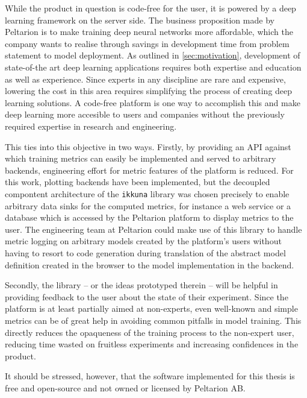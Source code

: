 While the product in question is code-free for the user, it is powered by a deep
learning framework on the server side. The business proposition made by
Peltarion is to make training deep neural networks more affordable, which the
company wants to realise through savings in development time from problem
statement to model deployment. As outlined in \cref{sec:motivation}, development
of state-of-the art deep learning applications requires both expertise and
education as well as experience. Since experts in any discipline are rare and
expensive, lowering the cost in this area requires simplifying the process of
creating deep learning solutions. A code-free platform is one way to accomplish
this and make deep learning more accesible to users and companies without the
previously required expertise in research and engineering.

This ties into this objective in two ways. Firstly, by providing an API against
which training metrics can easily be implemented and served to arbitrary
backends, engineering effort for metric features of the platform is reduced. For
this work, plotting backends have been implemented, but the decoupled compontent
architecture of the \texttt{ikkuna} library was chosen precisely to enable
arbitrary data sinks for the computed metrics, for instance a web service or a
database which is accessed by the Peltarion platform to display metrics to the
user. The engineering team at Peltarion could make use of this library to handle
metric logging on arbitrary models created by the platform's users without
having to resort to code generation during translation of the abstract model
definition created in the browser to the model implementation in the backend.

Secondly, the library -- or the ideas prototyped therein -- will be helpful in
providing feedback to the user about the state of their experiment. Since the
platform is at least partially aimed at non-experts, even well-known and simple
metrics can be of great help in avoiding common pitfalls in model training. This
directly reduces the opaqueness of the training process to the non-expert user,
reducing time wasted on fruitless experiments and increasing confidences in the
product.

It should be stressed, however, that the software implemented for this thesis is
free and open-source and not owned or licensed by Peltarion AB.
